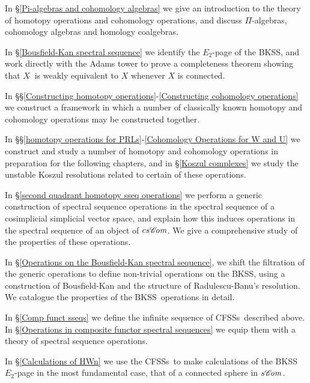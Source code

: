 \documentclass[11pt]{amsart} \renewcommand{\baselinestretch}{1.2}
\theoremstyle{plain}
\numberwithin{equation}{section} %
\theoremstyle{plain}
\numberwithin{equation}{chapter} %
\newcommand{\scrC}{\mathscr{C}}
\newcommand{\algs}{{\scrC\!\textit{\normalfont\textit{om}}}}
\newcommand{\BKSS}{BKSS}
\newcommand{\CFSSs}{CFSSs}
\begin{document}
\begin{Introduction}
In \S\ref{Pi-algebras and cohomology algebras} we give an introduction to the theory of homotopy operations and cohomology operations, and discuss $\Pi$-algebras, cohomology algebras and homology coalgebras.

In \S\ref{Bousfield-Kan spectral sequence} we identify the $E_2$-page of the \BKSS, and work directly with the Adams tower to prove a completeness theorem showing that $X\hat{\ }$ is weakly equivalent to $ X$ whenever $X$ is connected. %


In \S\S\ref{Constructing homotopy operations}-\ref{Constructing cohomology operations} %
we construct a framework in which a number of classically known homotopy and cohomology operations may be constructed together.

In \S\S\ref{homotopy operations for PRLs}-\ref{Cohomology Operations for W and U} we construct and study a number of homotopy and cohomology operations in preparation for the following chapters, and in \S\ref{Koszul complexes} we study the unstable Koszul resolutions related to certain of these operations.


In \S\ref{second quadrant homotopy sseq operations} we perform  a generic construction of spectral sequence operations in the spectral sequence of a cosimplicial simplicial vector space, and explain how this induces operations in the spectral sequence of an object of $cs\algs$. We give a comprehensive study of the properties of these operations.

In \S\ref{Operations on the Bousfield-Kan spectral sequence}, we shift the filtration of the generic operations to define non-trivial operations on the \BKSS, using a construction of Bousfield-Kan and the structure of Radulescu-Banu's resolution. We catalogue the properties of the \BKSS\ operations in detail.


In \S\ref{Comp funct sseqs} we define the infinite sequence of \CFSSs\ described above. In \S\ref{Operations in composite functor spectral sequences} we equip them with a theory of spectral sequence operations. 

In \S\ref{Calculations of HWn} we use the \CFSSs\  to make calculations of the \BKSS\ $E_2$-page in the most fundamental case, that of a connected sphere in $s\algs$.


\end{Introduction}
\end{document}
